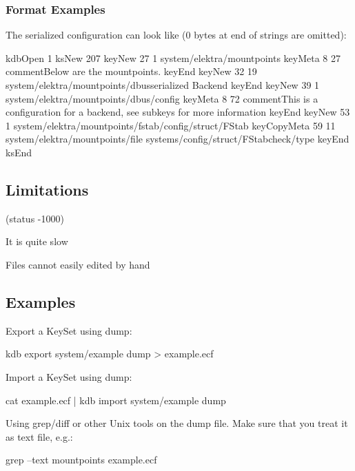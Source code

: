 \subsubsection*{Format Examples}

The serialized configuration can look like (0 bytes at end of strings are omitted)\+: \begin{DoxyVerb}kdbOpen 1
ksNew 207
keyNew 27 1
system/elektra/mountpoints
keyMeta 8 27
commentBelow are the mountpoints.
keyEnd
keyNew 32 19
system/elektra/mountpoints/dbusserialized Backend
keyEnd keyNew 39 1
system/elektra/mountpoints/dbus/config
keyMeta 8 72
commentThis is a configuration for a backend, see subkeys for more information
keyEnd
keyNew 53 1
system/elektra/mountpoints/fstab/config/struct/FStab
keyCopyMeta 59 11
system/elektra/mountpoints/file
systems/config/struct/FStabcheck/type
keyEnd
ksEnd
\end{DoxyVerb}


\subsection*{Limitations}

(status -\/1000)


\begin{DoxyItemize}
\item It is quite slow
\item Files cannot easily edited by hand
\end{DoxyItemize}

\subsection*{Examples}

Export a Key\+Set using {\ttfamily dump}\+: \begin{DoxyVerb}kdb export system/example dump > example.ecf
\end{DoxyVerb}


Import a Key\+Set using {\ttfamily dump}\+: \begin{DoxyVerb}cat example.ecf | kdb import system/example dump
\end{DoxyVerb}


Using grep/diff or other Unix tools on the dump file. Make sure that you treat it as text file, e.\+g.\+: \begin{DoxyVerb}grep --text mountpoints example.ecf\end{DoxyVerb}
 